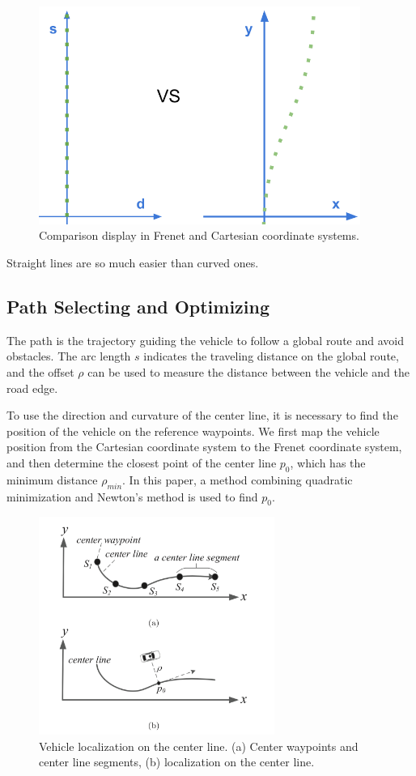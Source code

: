 \begin{figure}[h]
\centering
\includegraphics[height=2.8in]{figs/ch3/frenet-final}
\caption{Comparison display in Frenet and Cartesian coordinate systems.}
\label{fig:frenet-final}
\end{figure}

Straight lines are so much easier than curved ones.

\subsection{Path Selecting and Optimizing}

The path is the trajectory guiding the vehicle to follow a global route and avoid obstacles. The arc length $s$ indicates the traveling distance on the global route, and the offset $\rho$ can be used to measure the distance between the vehicle and the road edge.

To use the direction and curvature of the center line, it is necessary to find the position of the vehicle on the reference waypoints. We first map the vehicle position from the Cartesian coordinate system to the Frenet coordinate system, and then determine the closest point of the center line $p_0$, which has the minimum distance $\rho_{min}$. In this paper, a method combining quadratic minimization and Newton's method is used to find $p_0$.

\begin{figure}[h]
\centering
\includegraphics[height=2.8in]{figs/ch3/location-on-center-line}
\caption{Vehicle localization on the center line. (a) Center waypoints and center line segments, (b) localization on the center line.}
\label{fig:loc-line}
\end{figure}

